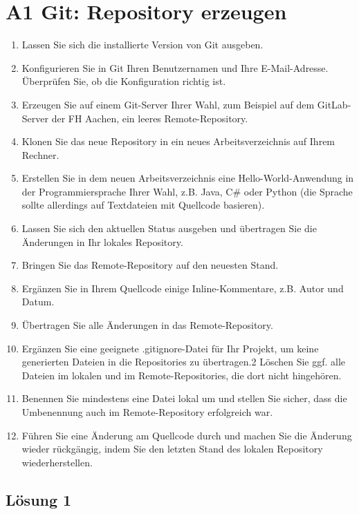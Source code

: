 \documentclass[main.tex]{subfiles}
\begin{document}
\section{A1 Git: Repository erzeugen}

\renewcommand{\labelenumi}{\arabic{enumi}.}
\begin{enumerate}
\item  Lassen Sie sich die installierte Version von Git ausgeben.
\item  Konfigurieren Sie in Git Ihren Benutzernamen und Ihre E-Mail-Adresse. Überprüfen Sie, ob die Konfiguration richtig ist.
\item  Erzeugen Sie auf einem Git-Server Ihrer Wahl, zum Beispiel auf dem GitLab-Server der FH Aachen, ein leeres Remote-Repository.
\item  Klonen Sie das neue Repository in ein neues Arbeitsverzeichnis auf Ihrem Rechner.
\item  Erstellen Sie in dem neuen Arbeitsverzeichnis eine Hello-World-Anwendung in der Programmiersprache Ihrer Wahl, z.B. Java, C\# oder Python (die Sprache sollte allerdings auf Textdateien mit Quellcode basieren).
\item  Lassen Sie sich den aktuellen Status ausgeben und übertragen Sie die Änderungen in Ihr lokales Repository.
\item  Bringen Sie das Remote-Repository auf den neuesten Stand.
\item  Ergänzen Sie in Ihrem Quellcode einige Inline-Kommentare, z.B. Autor und Datum.
\item  Übertragen Sie alle Änderungen in das Remote-Repository.
\item  Ergänzen Sie eine geeignete .gitignore-Datei für Ihr Projekt, um keine generierten Dateien in die Repositories zu übertragen.2 Löschen Sie ggf. alle Dateien im lokalen und im Remote-Repositories, die dort nicht hingehören.
\item  Benennen Sie mindestens eine Datei lokal um und stellen Sie sicher, dass die Umbenennung auch im Remote-Repository erfolgreich war.
\item  Führen Sie eine Änderung am Quellcode durch und machen Sie die Änderung wieder rückgängig, indem Sie den letzten Stand des lokalen Repository wiederherstellen.
\end{enumerate}

\subsection{Lösung 1}
\end{document}
